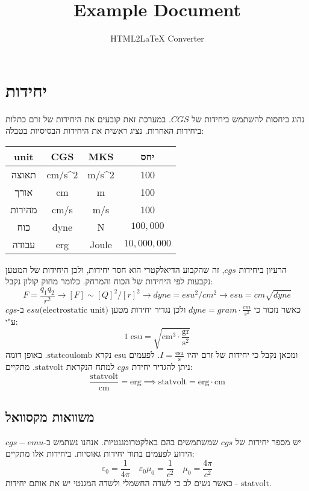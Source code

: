 \documentclass{tstextbook}
\begin{document}
\title{Example Document}
\author{HTML2LaTeX Converter}
\maketitle


\section{יחידות}

נהוג ביחסות להשתמש ביחידות של \(CGS\). במערכת זאת קובעים את היחידות של זרם כתלות ביחידות האחרות. נציג ראשית את היחידות הבסיסיות בטבלה:

\begin{table}[htbp]
  \centering
  \begin{tabular}{|cccc|}
    \hline
    unit & CGS & MKS & יחס \\ \hline
    תאוצה & cm/s^2 & m/s^2 & 100 \\ \hline
    אורך & cm & m & 100 \\ \hline
    מהירות & cm/s & m/s & 100 \\ \hline
    כוח & dyne & N & \(100,000\) \\ \hline
    עבודה & erg & Joule & \(10,000,000\) \\ \hline
  \end{tabular}
\end{table}
הרעיון ביחידות \(cgs\), זה שהקבוע הדיאלקטרי הוא חסר יחידות, ולכן היחידות של המטען נקבעות לפי היחידות של הכוח והמרחק. כלומר מחוק קולון נקבל:
$$F={\frac{q_{1}q_{2}}{r^{2}}}\rightarrow[F]\sim[Q]^{2}/[r]^{2}\rightarrow d y n e=e s u^{2}/c m^{2}\rightarrow e s u=c m\sqrt{d y n e}$$
כאשר נזכור כי \(dyne=gram\cdot \frac{cm}{s^2}\) ולכן נגדיר יחידות מטען \(esu\text{(electrostatic unit)}\) ב-\(cgs\) ע"י:
$$1\;\mathrm{esu}=\sqrt{ \mathrm{cm}^3\cdot \mathrm{\frac{gr}{s^2}} }$$
ומכאן נקבל כי יחידות של זרם יהיו \(I=\mathrm{\frac{esu}{s}}\). לפעמים \(\mathrm{esu}\) נקרא \(\mathrm{statcoulomb}\).
באופן דומה ניתן להגדיר יחידת \(cgs\) למתח הנקראת \(\mathrm{statvolt}\). מתקיים:
$$\frac{\mathrm{statvolt}}{\mathrm{cm}}=\mathrm{erg}\implies \mathrm{statvolt=erg\cdot cm}$$

\subsection{משוואות מקסוואל}

יש מספר יחידות של \(cgs\) שמשתמשים בהם באלקטרומגנטיות. אנחנו נשתמש ב-\(cgs-emu\) הידוע לפעמים בתור יחידות גאוסיות. ביחידות אלו מתקיים:
$$\varepsilon_{0}=\frac{1}{4\pi}\quad \varepsilon_{0}\mu_{0}=\frac{1}{c^{2}}\quad \mu_{0}=\frac{4\pi}{c^{2}}$$
כאשר נשים לב כי לשדה החשמלי ולשדה המגנטי יש את אותם יחידות - \(\mathrm{statvolt}\).
\end{document}
